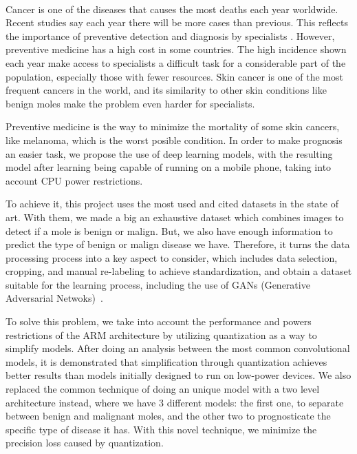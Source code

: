 \vspace{0.7cm}
\\

Cancer is one of the diseases that causes the most deaths each year worldwide. Recent studies say each year there will be more cases than previous. This reflects the importance of preventive detection and diagnosis by specialists . However, preventive medicine has a high cost in some countries. The high incidence shown each year make access to specialists a difficult task for a considerable part of the population, especially those with fewer resources. Skin cancer is one of the most frequent cancers in the world, and its similarity to other skin conditions like benign moles make the problem even harder for specialists.

Preventive medicine is the way to minimize the mortality of some skin cancers, like melanoma, which is the worst posible condition. In order to make prognosis an easier task, we propose the use of deep learning models, with the resulting model after learning being capable of running on a mobile phone, taking into account CPU power restrictions.

To achieve it, this project uses the most used and cited datasets in the state of art. With them, we made a big an exhaustive dataset which combines images to detect if a mole is benign or malign. But, we also have enough information to predict the type of benign or malign disease we have. Therefore, it turns the data processing process into a key aspect to consider, which includes data selection, cropping, and manual re-labeling to achieve standardization, and obtain a dataset suitable for the learning process, including the use of GANs (Generative Adversarial Netwoks)~\cite{goodfellow2014generative}.

To solve this problem, we take into account the performance and powers restrictions of the ARM architecture by utilizing quantization as a way to simplify models. After doing an analysis between the most common convolutional models, it is demonstrated that simplification through quantization achieves better results than models initially designed to run on low-power devices.  We also replaced the common technique of doing an unique model with a two level architecture instead, where we have 3 different models: the first one, to separate between benign and malignant moles, and the other two to prognosticate the specific type of disease it has. With this novel technique, we minimize the precision loss caused by quantization.

